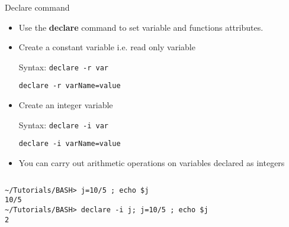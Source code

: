 \documentclass[slidestop,mathserif,compress,xcolor=svgnames]{beamer}
\newenvironment{eblock}[0]
{
\begin{beamerboxesrounded}[upper=uppercol2,lower=lowercol2,shadow=true]}
{\end{beamerboxesrounded}}
\begin{document}
\begin{frame}[fragile]{\small Declare command}
  \begin{itemize}
    \item Use the \textbf{declare} command to set variable and functions attributes.
    \item Create a constant variable i.e. read only variable
    \item[Syntax:] \texttt{declare -r var}
    \item[] \texttt{declare -r varName=value}
    \item Create an integer variable
    \item[Syntax:] \texttt{declare -i var}
    \item[] \texttt{declare -i varName=value}
    \item You can carry out arithmetic operations on variables declared as integers
  \end{itemize}
  \begin{columns}
    \column{5cm}
    \begin{eblock}{}
      \begin{lstlisting}
~/Tutorials/BASH> j=10/5 ; echo $j
10/5
~/Tutorials/BASH> declare -i j; j=10/5 ; echo $j
2
      \end{lstlisting}
    \end{eblock}
  \end{columns}
\end{frame}
\end{document}
